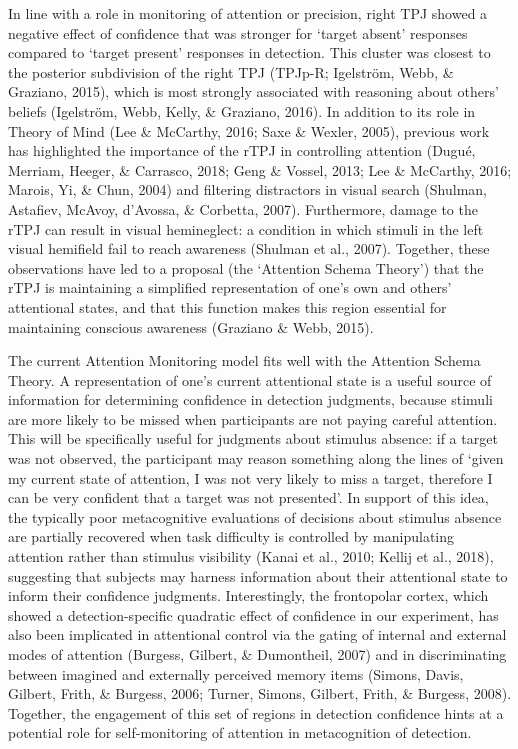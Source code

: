 \documentclass[12pt,twoside]{reedthesis}
\begin{document}
In line with a role in monitoring of attention or precision, right TPJ showed a negative effect of confidence that was stronger for `target absent' responses compared to `target present' responses in detection. This cluster was closest to the posterior subdivision of the right TPJ (TPJp-R; Igelström, Webb, \& Graziano, 2015), which is most strongly associated with reasoning about others' beliefs (Igelström, Webb, Kelly, \& Graziano, 2016). In addition to its role in Theory of Mind (Lee \& McCarthy, 2016; Saxe \& Wexler, 2005), previous work has highlighted the importance of the rTPJ in controlling attention (Dugué, Merriam, Heeger, \& Carrasco, 2018; Geng \& Vossel, 2013; Lee \& McCarthy, 2016; Marois, Yi, \& Chun, 2004) and filtering distractors in visual search (Shulman, Astafiev, McAvoy, d'Avossa, \& Corbetta, 2007). Furthermore, damage to the rTPJ can result in visual hemineglect: a condition in which stimuli in the left visual hemifield fail to reach awareness (Shulman et al., 2007). Together, these observations have led to a proposal (the `Attention Schema Theory') that the rTPJ is maintaining a simplified representation of one's own and others' attentional states, and that this function makes this region essential for maintaining conscious awareness (Graziano \& Webb, 2015).

The current Attention Monitoring model fits well with the Attention Schema Theory. A representation of one's current attentional state is a useful source of information for determining confidence in detection judgments, because stimuli are more likely to be missed when participants are not paying careful attention. This will be specifically useful for judgments about stimulus absence: if a target was not observed, the participant may reason something along the lines of `given my current state of attention, I was not very likely to miss a target, therefore I can be very confident that a target was not presented'. In support of this idea, the typically poor metacognitive evaluations of decisions about stimulus absence are partially recovered when task difficulty is controlled by manipulating attention rather than stimulus visibility (Kanai et al., 2010; Kellij et al., 2018), suggesting that subjects may harness information about their attentional state to inform their confidence judgments. Interestingly, the frontopolar cortex, which showed a detection-specific quadratic effect of confidence in our experiment, has also been implicated in attentional control via the gating of internal and external modes of attention (Burgess, Gilbert, \& Dumontheil, 2007) and in discriminating between imagined and externally perceived memory items (Simons, Davis, Gilbert, Frith, \& Burgess, 2006; Turner, Simons, Gilbert, Frith, \& Burgess, 2008). Together, the engagement of this set of regions in detection confidence hints at a potential role for self-monitoring of attention in metacognition of detection.
\end{document}
